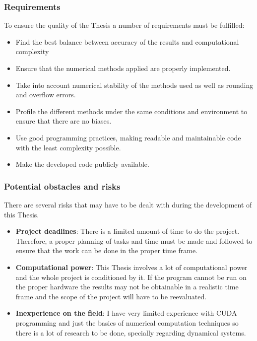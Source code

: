 \subsubsection{Requirements}

To ensure the quality of the Thesis a number of requirements must be fulfilled:
\begin{itemize}
    \item Find the best balance between accuracy of the results and computational complexity
    \item Ensure that the numerical methods applied are properly implemented.
    \item Take into account numerical stability of the methods used as well as rounding and overflow errors.
    \item Profile the different methods under the same conditions and environment to ensure that there are no biases.
    \item Use good programming practices, making readable and maintainable code with the least complexity possible.
    \item Make the developed code publicly available.
\end{itemize}

\subsubsection{Potential obstacles and risks}%
\label{ssub:intro_risks}

There are several risks that may have to be dealt with during the development of this Thesis.

\begin{itemize}
    \item \textbf{Project deadlines}: There is a limited amount of time to do
        the project. Therefore, a proper planning of tasks and time must be made
        and followed to ensure that the work can be done in the proper time
        frame.
    \item \textbf{Computational power}: This Thesis involves a lot of
        computational power and the whole project is conditioned by it. If the
        program cannot be run on the proper hardware the results may not be
        obtainable in a realistic time frame and the scope of the project will
        have to be reevaluated.
    \item \textbf{Inexperience on the field}: I have very limited experience
        with CUDA programming and just the basics of numerical computation
        techniques so there is a lot of research to be done, specially regarding
        dynamical systems.
\end{itemize}

